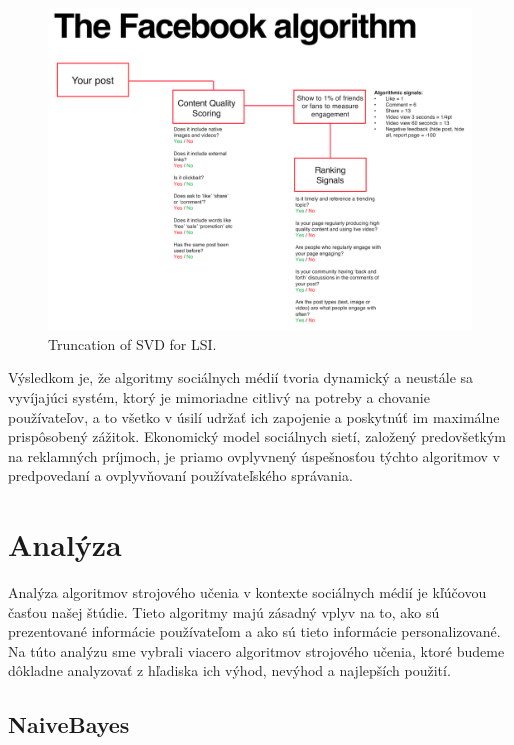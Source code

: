 \documentclass[12pt,twoside,slovak,a4paper]{article}
\begin{document}
\begin{figure}[h]
    \centering
    \includegraphics[scale=0.6]{FacebookAlgorithmExample.PNG} 
    \caption{Truncation of SVD for LSI. \cite{7087040}} %
    \label{fig:truncation}
\end{figure}


Výsledkom je, že algoritmy sociálnych médií tvoria dynamický a neustále sa vyvíjajúci systém, ktorý je mimoriadne citlivý na potreby a chovanie používateľov, a to všetko v úsilí udržať ich zapojenie a poskytnúť im maximálne prispôsobený zážitok. Ekonomický model sociálnych sietí, založený predovšetkým na reklamných príjmoch, je priamo ovplyvnený úspešnosťou týchto algoritmov v predpovedaní a ovplyvňovaní používateľského správania.








\section{Analýza}
Analýza algoritmov strojového učenia v kontexte sociálnych médií je kľúčovou časťou našej štúdie. Tieto algoritmy majú zásadný vplyv na to, ako sú prezentované informácie používateľom a ako sú tieto informácie personalizované. Na túto analýzu sme vybrali viacero algoritmov strojového učenia, ktoré budeme dôkladne analyzovať z hľadiska ich výhod, nevýhod a najlepších použití.



\subsection{NaiveBayes\cite{7809906}}
\end{document}
